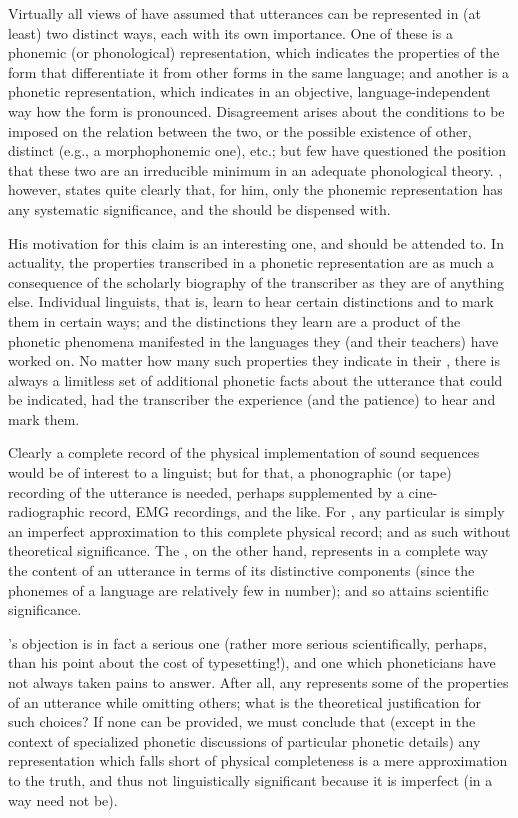 Virtually all views of  have assumed that utterances
can be represented in (at least) two distinct ways, each with its own
importance. One of these is a phonemic (or phonological)
representation, which indicates the properties of the form that
differentiate it from other forms in the same language; and another is
a phonetic representation, which indicates in an objective,
language-independent way how the form is pronounced. Disagreement
arises about the conditions to be imposed on the relation between the
two, or the possible existence of other, distinct 
(e.g., a morphophonemic one), etc.; but few have questioned the
position that these two are an irreducible minimum in an adequate
phonological theory. {\Bloomfield}, however, states quite clearly that,
for him, only the phonemic representation has any systematic
significance, and the  should be dispensed with.

His motivation for this claim is an interesting one, and should be
attended to. In actuality, the properties transcribed in a phonetic
representation are as much a consequence of the scholarly biography of
the transcriber as they are of anything else. Individual linguists,
that is, learn to hear certain distinctions and to mark them in
certain ways; and the distinctions they learn are a product of the
phonetic phenomena manifested in the languages they (and their
teachers) have worked on. No matter how many such properties they
indicate in their , there is always a limitless set of
additional phonetic facts about the utterance that could be indicated,
had the transcriber the experience (and the patience) to hear and mark
them.

Clearly a complete record of the physical implementation of sound
sequences would be of interest to a linguist; but for that, a
phonographic (or tape) recording of the utterance is needed, perhaps
supplemented by a cine-radiographic record, EMG recordings, and the
like. For {\Bloomfield}, any particular  is simply
an imperfect approximation to this complete physical record; and as
such without theoretical significance. The , on
the other hand, represents in a complete way the content of an
utterance in terms of its distinctive components (since the phonemes
of a language are relatively few in number); and so attains scientific
significance.

{\Bloomfield}'s objection is in fact a serious one (rather more serious
scientifically, perhaps, than his point about the cost of
typesetting!), and one which phoneticians have not always taken pains
to answer. After all, any  represents some of
the properties of an utterance while omitting others; what is the
theoretical justification for such choices? If none can be provided,
we must conclude that (except in the context of specialized phonetic
discussions of particular phonetic details) any representation which
falls short of physical completeness is a mere approximation to the
truth, and thus not linguistically significant because it is imperfect
(in a way  need not be).

